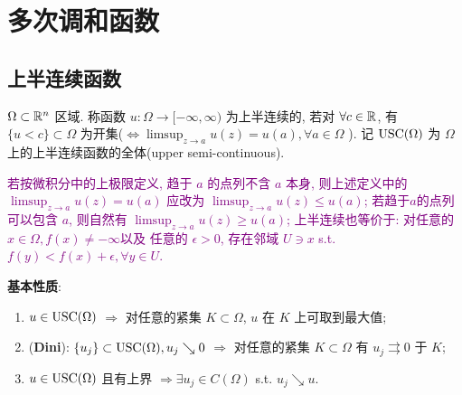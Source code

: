 \chapter{多次调和函数}
\section{上半连续函数}

\begin{definition}
    $\Omega \subset {\mathbb R}^n$ 区域. 称函数 $u:\Omega \to [-\infty ,\infty )$ 为上半连续的, 若对 $\forall c \in {\mathbb R}$, 有 $\{u<c\} \subset \Omega $ 为开集($\iff \limsup_{z \to a}u(z)=u(a), \forall a \in \Omega $ ).  
    记 $\operatorname{USC}(\Omega )$ 为 $\Omega $ 上的上半连续函数的全体(upper semi-continuous).     
\end{definition}
\begin{remark}
    \textcolor{purple}{若按微积分中的上极限定义, 趋于 $a$ 的点列不含 $a$ 本身, 则上述定义中的 $\limsup_{z \to a}u(z) = u(a)$ 应改为 $\limsup_{z \to a}u(z)\leq u(a)$; 若趋于$a$的点列可以包含 $a$, 则自然有 $\limsup_{z \to a}u(z)\geq u(a)$; 上半连续也等价于: 对任意的 $x \in \Omega, f(x)\neq -\infty  $以及 任意的 $\epsilon >0$, 存在邻域 $U \ni x$ s.t. $f(y)<f(x)+\epsilon, \forall y \in U$.    }
\end{remark}
\textbf{基本性质}:
\begin{enumerate}[(1)]
    \item $u \in \operatorname{USC}(\Omega )$ $\Rightarrow $ 对任意的紧集 $K \subset \Omega $, $u$ 在 $K$ 上可取到最大值;
    \item (\textbf{Dini}): $\{u_{j}\} \subset \operatorname{USC}(\Omega ), u_{j} \searrow 0$ $\Rightarrow $ 对任意的紧集 $K \subset \Omega $ 有 $u_{j} \rightrightarrows 0$ 于 $K$;
    \item $u \in \operatorname{USC}(\Omega )$ 且有上界 $\Rightarrow \exists u_{j} \in C(\Omega )$ s.t. $u_{j} \searrow u$.             
\end{enumerate}
